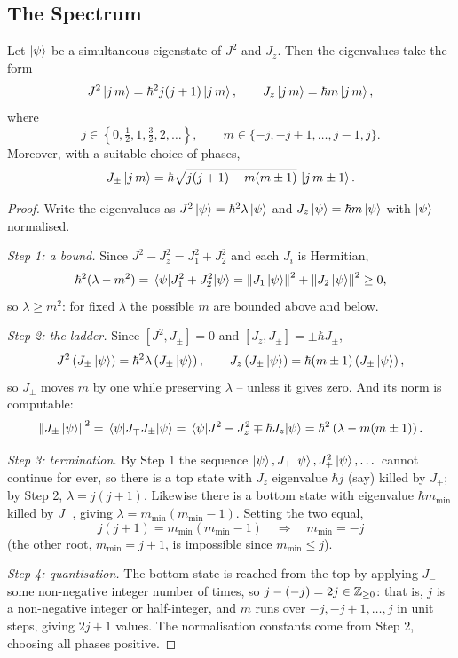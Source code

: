 \documentclass[a4paper]{scrartcl}
\begin{document}
\subsection{The Spectrum}

\begin{theorem}
    Let $\ket{\psi}$ be a simultaneous eigenstate of $J^2$ and $J_z$. Then the eigenvalues take the form
    $$
    J^2 \ket{j\,m} = \hbar^2 j(j+1)\ket{j\,m}, \qquad J_z \ket{j\, m} = \hbar m \ket{j\,m},
    $$
    where
    $$
    j \in \left\{ 0, \tfrac12, 1, \tfrac32, 2, \dots \right\}, \qquad m \in \{-j, -j+1, \dots, j-1, j\}.
    $$
    Moreover, with a suitable choice of phases,
    $$
    J_\pm \ket{j\,m} = \hbar\sqrt{j(j+1) - m(m\pm1)}\,\ket{j\, m\pm 1}.
    $$
\end{theorem}
\begin{proof}
    Write the eigenvalues as $J^2\ket{\psi} = \hbar^2\lambda\ket{\psi}$ and $J_z\ket{\psi} = \hbar m \ket{\psi}$ with $\ket{\psi}$ normalised.

    \emph{Step 1: a bound.} Since $J^2 - J_z^2 = J_1^2 + J_2^2$ and each $J_i$ is Hermitian,
    $$
    \hbar^2(\lambda - m^2) = \mel{\psi}{J_1^2 + J_2^2}{\psi} = \norm{J_1\ket{\psi}}^2 + \norm{J_2\ket{\psi}}^2 \geq 0,
    $$
    so $\lambda \geq m^2$: for fixed $\lambda$ the possible $m$ are bounded above and below.

    \emph{Step 2: the ladder.} Since $[J^2, J_\pm] = 0$ and $[J_z, J_\pm] = \pm\hbar J_\pm$,
    $$
    J^2 \left( J_\pm \ket{\psi} \right) = \hbar^2 \lambda \left( J_\pm\ket{\psi}\right), \qquad J_z \left(J_\pm\ket{\psi}\right) = \hbar(m\pm1)\left(J_\pm\ket{\psi}\right),
    $$
    so $J_\pm$ moves $m$ by one while preserving $\lambda$ -- unless it gives zero. And its norm is computable:
    $$
    \norm{J_\pm \ket{\psi}}^2 = \mel{\psi}{J_\mp J_\pm}{\psi} = \mel{\psi}{J^2 - J_z^2 \mp \hbar J_z}{\psi} = \hbar^2 \left( \lambda - m(m\pm1) \right).
    $$

    \emph{Step 3: termination.} By Step 1 the sequence $\ket\psi, J_+\ket\psi, J_+^2\ket\psi, \dots$ cannot continue for ever, so there is a top state with $J_z$ eigenvalue $\hbar j$ (say) killed by $J_+$; by Step 2, $\lambda = j(j+1)$. Likewise there is a bottom state with eigenvalue $\hbar m_{\min}$ killed by $J_-$, giving $\lambda = m_{\min}(m_{\min}-1)$. Setting the two equal,
    $$
    j(j+1) = m_{\min}(m_{\min}-1) \quad \Longrightarrow \quad m_{\min} = -j
    $$
    (the other root, $m_{\min} = j+1$, is impossible since $m_{\min}\leq j$).

    \emph{Step 4: quantisation.} The bottom state is reached from the top by applying $J_-$ some non-negative integer number of times, so $j - (-j) = 2j \in \mathbb{Z}_{\geq0}$: that is, $j$ is a non-negative integer or half-integer, and $m$ runs over $-j, -j+1, \dots, j$ in unit steps, giving $2j+1$ values. The normalisation constants come from Step 2, choosing all phases positive.
\end{proof}
\end{document}
